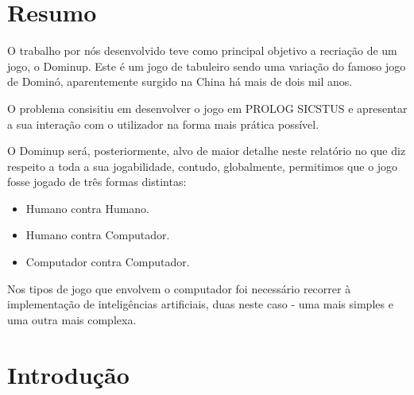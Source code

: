 \documentclass[a4paper]{article}
\begin{document}


\newpage

\section*{Resumo}

O trabalho por nós desenvolvido teve como principal objetivo a recriação de um jogo, o Dominup. Este é um jogo de tabuleiro sendo uma variação do famoso jogo de Dominó, aparentemente surgido na China há mais de dois mil anos.

O problema consisitiu em desenvolver o jogo em PROLOG SICSTUS e apresentar a sua interação com o utilizador na forma mais prática possível.

O Dominup será, posteriormente, alvo de maior detalhe neste relatório no que diz respeito a toda a sua jogabilidade, contudo, globalmente, permitimos que o jogo fosse jogado de três formas distintas:

\begin{itemize}
	\item Humano contra Humano.
	\item Humano contra Computador.
	\item Computador contra Computador.
\end{itemize}

Nos tipos de jogo que envolvem o computador foi necessário recorrer à implementação de inteligências artificiais, duas neste caso - uma mais simples e uma outra mais complexa.


\newpage

\tableofcontents


\newpage

\section{Introdução}
\end{document}
